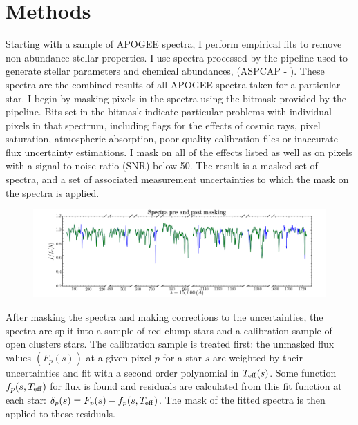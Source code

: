 \documentclass[preprint]{aastex}
\begin{document}
\section{Methods}
\label{sec:methods}

 
Starting with a sample of APOGEE spectra, I perform empirical fits to remove non-abundance stellar properties. I use spectra processed by the pipeline used to generate stellar parameters and chemical abundances, (ASPCAP - \citealt{ASPCAP}). These spectra are the combined results of all APOGEE spectra taken for a particular star. I begin by masking pixels in the spectra using the bitmask provided by the pipeline. Bits set in the bitmask indicate particular problems with individual pixels in that spectrum, including flags for the effects of cosmic rays, pixel saturation, atmospheric absorption, poor quality calibration files or inaccurate flux uncertainty estimations. I mask on all of the effects listed as well as on pixels with a signal to noise ratio (SNR) below 50.  The result is a masked set of spectra, and a set of associated measurement uncertainties to which the mask on the spectra is applied.

\begin{figure}[H]
\centering
\includegraphics[width = \linewidth]{examplespectrum.png}
\caption{}
\label{fig:spectra}
\end{figure}

After masking the spectra and making corrections to the uncertainties,  the spectra are split into a sample of red clump stars and a calibration sample of open clusters stars. The calibration sample is treated first: the unmasked flux values $(F_p(s))$ at a given pixel $p$  for a star $s$  are weighted by their uncertainties and fit with a second order polynomial in $T_{\rm eff}(s)$. Some function $f_p(s,T_{\rm eff})$ for flux is found  and residuals are calculated from this fit function at each star: $\delta_{p}(s) = F_p(s) - f_p(s,T_{\rm eff})$. The mask of the fitted spectra is then applied to these residuals.
\end{document}
